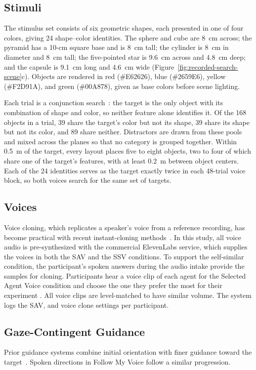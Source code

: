 \subsection{Stimuli}
\label{sec:stimuli}
The stimulus set consists of six geometric shapes, each presented in one of four colors, giving 24 shape--color identities. The sphere and cube are 8~cm across; the pyramid has a 10-cm square base and is 8~cm tall; the cylinder is 8~cm in diameter and 8~cm tall; the five-pointed star is 9.6~cm across and 4.8~cm deep; and the capsule is 9.1~cm long and 4.6~cm wide (Figure~\ref{fig:recorded-search-scene}c). Objects are rendered in red (\#E62626), blue (\#2659E6), yellow (\#F2D91A), and green (\#00A878), given as base colors before scene lighting.

Each trial is a conjunction search~\cite{treisman1980feature}: the target is the only object with its combination of shape and color, so neither feature alone identifies it. Of the 168 objects in a trial, 39 share the target's color but not its shape, 39 share its shape but not its color, and 89 share neither. Distractors are drawn from these pools and mixed across the planes so that no category is grouped together. Within 0.5~m of the target, every layout places five to eight objects, two to four of which share one of the target's features, with at least 0.2~m between object centers. Each of the 24 identities serves as the target exactly twice in each 48-trial voice block, so both voices search for the same set of targets.

\subsection{Voices}
\label{sec:voices}
Voice cloning, which replicates a speaker's voice from a reference recording, has become practical with recent instant-cloning methods~\cite{qin2023openvoice}. In this study, all voice audio is pre-synthesized with the commercial ElevenLabs service, which supplies the voices in both the SAV and the SSV conditions. To support the self-similar condition, the participant's spoken answers during the audio intake provide the samples for cloning. Participants hear a voice clip of each agent for the Selected Agent Voice condition and choose the one they prefer the most for their experiment . All voice clips are level-matched to have similar volume. The system logs the SAV, and voice clone settings per participant.

\subsection{Gaze-Contingent Guidance}
Prior guidance systems combine initial orientation with finer guidance toward the target~\cite{kwok2022twostep,tanaka2026coarse}. Spoken directions in Follow My Voice follow a similar progression.

